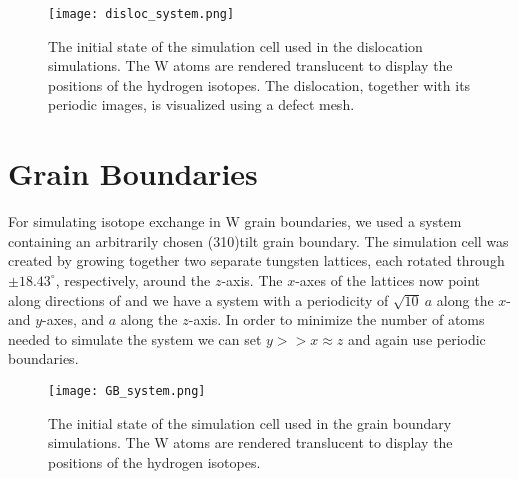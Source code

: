 
\begin{figure}[!ht]
\center
\texttt{[image: disloc\_system.png]}
\caption{The initial state of the simulation cell used in the dislocation simulations. 
The W atoms are rendered translucent to display the positions of the hydrogen isotopes. 
The dislocation, together with its periodic images, is visualized using a defect mesh.}
\label{Fig:disloc_system}
\end{figure}

\section{Grain Boundaries}
For simulating isotope exchange in W grain boundaries, we used a system containing an arbitrarily chosen \hkl(310)\hkl[001] tilt grain boundary. The simulation cell was created by growing together two separate tungsten lattices, each rotated through $\pm18.43^\circ$, respectively, around the $z$-axis. 
The $x$-axes of the lattices now point along directions of  and we have a system with a periodicity of $\sqrt{10}~a$ along the $x$- and $y$-axes, and $a$ along the $z$-axis. 
In order to minimize the number of atoms needed to simulate the system we can set $y >> x \approx z$ and again use periodic boundaries.


\begin{figure}[!ht]
\center
\texttt{[image: GB\_system.png]}
\caption{The initial state of the simulation cell used in the grain boundary simulations. 
The W atoms are rendered translucent to display the positions of the hydrogen isotopes.}
\label{Fig:GB_system}
\end{figure}

